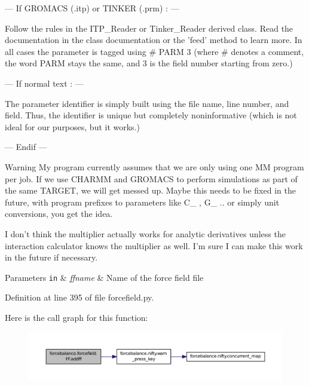--- If G\-R\-O\-M\-A\-C\-S (.itp) or T\-I\-N\-K\-E\-R (.prm) \-: ---

Follow the rules in the I\-T\-P\-\_\-\-Reader or Tinker\-\_\-\-Reader derived class. Read the documentation in the class documentation or the 'feed' method to learn more. In all cases the parameter is tagged using {\ttfamily  \# P\-A\-R\-M 3 } (where \# denotes a comment, the word P\-A\-R\-M stays the same, and 3 is the field number starting from zero.)

--- If normal text \-: ---

The parameter identifier is simply built using the file name, line number, and field. Thus, the identifier is unique but completely noninformative (which is not ideal for our purposes, but it works.)

--- Endif ---

\begin{DoxyWarning}{Warning}
My program currently assumes that we are only using one M\-M program per job. If we use C\-H\-A\-R\-M\-M and G\-R\-O\-M\-A\-C\-S to perform simulations as part of the same T\-A\-R\-G\-E\-T, we will get messed up. Maybe this needs to be fixed in the future, with program prefixes to parameters like C\-\_\- , G\-\_\- .. or simply unit conversions, you get the idea.

I don't think the multiplier actually works for analytic derivatives unless the interaction calculator knows the multiplier as well. I'm sure I can make this work in the future if necessary.
\end{DoxyWarning}

\begin{DoxyParams}[1]{Parameters}
\mbox{\tt in}  & {\em ffname} & Name of the force field file \\
\hline
\end{DoxyParams}


Definition at line 395 of file forcefield.\-py.



Here is the call graph for this function\-:\nopagebreak
\begin{figure}[H]
\begin{center}
\leavevmode
\includegraphics[width=350pt]{classforcebalance_1_1forcefield_1_1FF_a142d41c86b9b0ef57f93ec6fb349357b_cgraph}
\end{center}
\end{figure}


